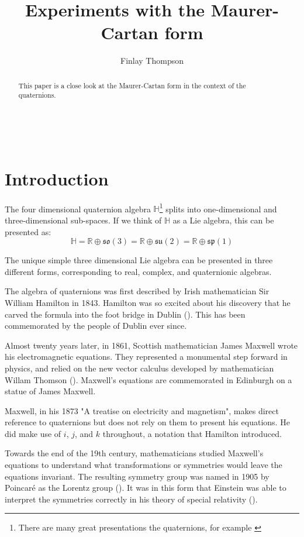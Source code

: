 \documentclass{article}
\title{Experiments with the Maurer-Cartan form}
\author{Finlay Thompson}
\date{\vspace*{-2ex}}
\newcommand{\HH}{\mathbb{H}}
\newcommand{\RR}{\mathbb{R}}
\newcommand{\so}{\mathfrak{so}}
\newcommand{\su}{\mathfrak{su}}
\renewcommand{\sp}{\mathfrak{sp}}
\begin{document}
\sloppy
\maketitle

\begin{abstract}
  This paper is a close look at the Maurer-Cartan form in the context of the quaternions.
\end{abstract}

\tableofcontents\

\section*{Introduction}

The four dimensional quaternion algebra $\HH$\footnote{There are many great presentations the quaternions, for example \cite{quaternion_text,quaternion_web,quaternion_video}} splits into one-dimensional and three-dimensional sub-spaces.
If we think of $\HH$ as a Lie algebra, this can be presented as:
$$\HH = \RR \oplus \so(3) = \RR \oplus \su(2) = \RR \oplus \sp(1) $$

The unique simple three dimensional Lie algebra can be presented in three different forms, corresponding to real, complex, and quaternionic algebras.

The algebra of quaternions was first described by Irish mathematician Sir William Hamilton in 1843.
Hamilton was so excited about his discovery that he carved the formula into the foot bridge in Dublin (\cite{footbridge}).
This has been commemorated by the people of Dublin ever since.

Almost twenty years later, in 1861, Scottish mathematician James Maxwell wrote his electromagnetic equations.
They represented a monumental step forward in physics, and relied on the new vector calculus developed by mathematician Willam Thomson (\cite{maxwell_electromagenetism}).
Maxwell's equations are commemorated in Edinburgh on a statue of James Maxwell.

Maxwell, in his 1873 "A treatise on electricity and magnetism", makes direct reference to quaternions but does not rely on them to present his equations.
He did make use of $i$, $j$, and $k$ throughout, a notation that Hamilton introduced.

Towards the end of the 19th century, mathematicians studied Maxwell's equations to understand what transformations or symmetries would leave the equations invariant.
The resulting symmetry group was named in 1905 by Poincaré as the Lorentz group (\cite{poincare_lorentz}).
It was in this form that Einstein was able to interpret the symmetries correctly in his theory of special relativity (\cite{einstein_special_relativity}).
\end{document}

